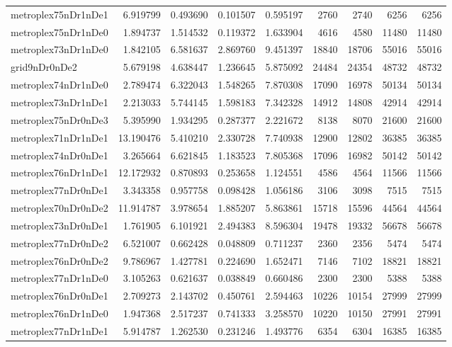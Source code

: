 \begin{longtable}{|l|r|r|r|r|r|r|r|r|}
metroplex75nDr1nDe1 & 6.919799 & 0.493690 & 0.101507 & 0.595197 & 2760 & 2740 & 6256 & 6256 \\
metroplex75nDr1nDe0 & 1.894737 & 1.514532 & 0.119372 & 1.633904 & 4616 & 4580 & 11480 & 11480 \\
metroplex73nDr1nDe0 & 1.842105 & 6.581637 & 2.869760 & 9.451397 & 18840 & 18706 & 55016 & 55016 \\
grid9nDr0nDe2 & 5.679198 & 4.638447 & 1.236645 & 5.875092 & 24484 & 24354 & 48732 & 48732 \\
metroplex74nDr1nDe0 & 2.789474 & 6.322043 & 1.548265 & 7.870308 & 17090 & 16978 & 50134 & 50134 \\
metroplex73nDr1nDe1 & 2.213033 & 5.744145 & 1.598183 & 7.342328 & 14912 & 14808 & 42914 & 42914 \\
metroplex75nDr0nDe3 & 5.395990 & 1.934295 & 0.287377 & 2.221672 & 8138 & 8070 & 21600 & 21600 \\
metroplex71nDr1nDe1 & 13.190476 & 5.410210 & 2.330728 & 7.740938 & 12900 & 12802 & 36385 & 36385 \\
metroplex74nDr0nDe1 & 3.265664 & 6.621845 & 1.183523 & 7.805368 & 17096 & 16982 & 50142 & 50142 \\
metroplex76nDr1nDe1 & 12.172932 & 0.870893 & 0.253658 & 1.124551 & 4586 & 4564 & 11566 & 11566 \\
metroplex77nDr0nDe1 & 3.343358 & 0.957758 & 0.098428 & 1.056186 & 3106 & 3098 & 7515 & 7515 \\
metroplex70nDr0nDe2 & 11.914787 & 3.978654 & 1.885207 & 5.863861 & 15718 & 15596 & 44564 & 44564 \\
metroplex73nDr0nDe1 & 1.761905 & 6.101921 & 2.494383 & 8.596304 & 19478 & 19332 & 56678 & 56678 \\
metroplex77nDr0nDe2 & 6.521007 & 0.662428 & 0.048809 & 0.711237 & 2360 & 2356 & 5474 & 5474 \\
metroplex76nDr0nDe2 & 9.786967 & 1.427781 & 0.224690 & 1.652471 & 7146 & 7102 & 18821 & 18821 \\
metroplex77nDr1nDe0 & 3.105263 & 0.621637 & 0.038849 & 0.660486 & 2300 & 2300 & 5388 & 5388 \\
metroplex76nDr0nDe1 & 2.709273 & 2.143702 & 0.450761 & 2.594463 & 10226 & 10154 & 27999 & 27999 \\
metroplex76nDr1nDe0 & 1.947368 & 2.517237 & 0.741333 & 3.258570 & 10220 & 10150 & 27991 & 27991 \\
metroplex77nDr1nDe1 & 5.914787 & 1.262530 & 0.231246 & 1.493776 & 6354 & 6304 & 16385 & 16385 \\

\end{longtable}
